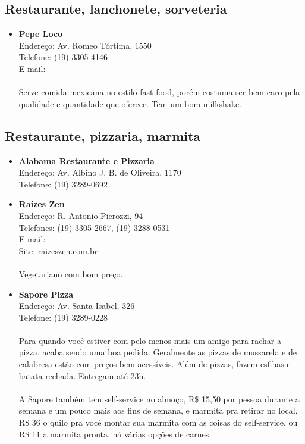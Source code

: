 \subsection{Restaurante, lanchonete, sorveteria}

\begin{itemize}
\item \textbf{Pepe Loco}
  \\Endereço: Av. Romeo Tórtima, 1550
  \\Telefone: (19) 3305-4146
  \\E-mail: 
  \\
  \\Serve comida mexicana no estilo fast-food, porém costuma ser bem caro pela
  qualidade e quantidade que oferece. Tem um bom milkshake.
\end{itemize}

\subsection{Restaurante, pizzaria, marmita}

\begin{itemize}
\item \textbf{Alabama Restaurante e Pizzaria}
  \\Endereço: Av. Albino J. B. de Oliveira, 1170
  \\Telefone: (19) 3289-0692

\item \textbf{Raízes Zen}
  \\Endereço: R. Antonio Pierozzi, 94
  \\Telefones: (19) 3305-2667, (19) 3288-0531
  \\E-mail: 
  \\Site: \url{raizeszen.com.br}
  \\
  \\Vegetariano com bom preço.

\item \textbf{Sapore Pizza}
  \\Endereço: Av. Santa Isabel, 326
  \\Telefone: (19) 3289-0228
  \\
  \\Para quando você estiver com pelo menos mais um amigo para rachar a pizza,
  acaba sendo uma boa pedida. Geralmente as pizzas de mussarela e de calabresa
  estão com preços bem acessíveis. Além de pizzas, fazem esfihas e batata
  rechada. Entregam até 23h.
  \\
  \\A Sapore também tem self-service no almoço, R\$ 15,50 por pessoa durante a
  semana e um pouco mais aos fins de semana, e marmita pra retirar no local,
  R\$ 36 o quilo pra você montar sua marmita com as coisas do self-service, ou
  R\$ 11 a marmita pronta, há várias opções de carnes.
\end{itemize}

